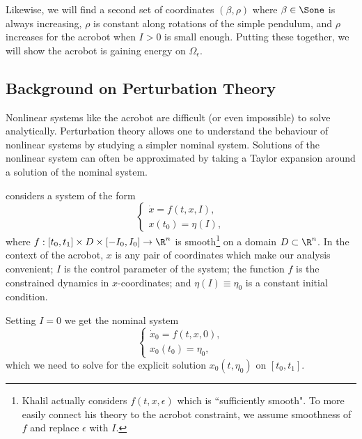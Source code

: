 Likewise, we will find a second set of coordinates \((\beta, \rho)\) where
\(\beta \in \Sone\) is always increasing, \(\rho\) is constant along
rotations of the simple pendulum, and \(\rho\) increases for the acrobot when
\(I > 0\) is small enough.
Putting these together, we will show the acrobot is gaining energy on
\(\Omega_\epsilon\).

\subsection{Background on Perturbation Theory}
Nonlinear systems like the acrobot are difficult (or even impossible) to solve
analytically.
Perturbation theory allows one to understand the behaviour of nonlinear systems
by studying a simpler nominal system. 
Solutions of the nonlinear system can often be approximated by taking a Taylor
expansion around a solution of the nominal system.

\citet{khalil_nonlinear} considers a system of the form
\begin{equation}\label{eqn:khalil-setup}
    \begin{cases}
        \dot{x} = f(t,x,I), \\
        x(t_0) = \eta(I),
    \end{cases}
\end{equation}
where 
\(f : [t_0,t_1] \times D \times [-I_0,I_0] \rightarrow \R^n\) is  
smooth\footnote{Khalil actually considers \(f(t,x,\epsilon)\) which is ``sufficiently
    smooth". To more easily connect his theory to the acrobot constraint, we
    assume smoothness of \(f\) and replace \(\epsilon\) with \(I\).}
on a domain \(D \subset \R^n\).
In the context of the acrobot, \(x\) is any pair of coordinates which make
our analysis convenient;
\(I\) is the control parameter of the system;
the function \(f\) is the constrained dynamics in \(x\)-coordinates;
and \(\eta(I) \equiv \eta_0\) is a constant initial condition.

Setting \(I = 0\) we get the nominal system
\begin{equation}\label{eqn:khalil-perturbation-nominal}
    \begin{cases}
        \dot{x}_0 = f(t,x,0) ,\\
        x_0(t_0) = \eta_0 ,
    \end{cases}
\end{equation}
which we need to solve for the explicit solution \(x_0(t,\eta_0)\) on \([t_0,t_1]\).

